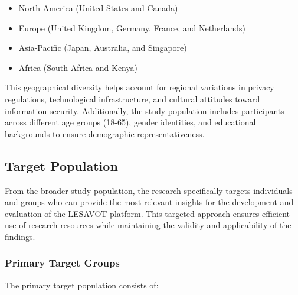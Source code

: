 \documentclass[12pt, a4paper, oneside]{book}
\begin{document}
\begin{itemize}[leftmargin=*]
    \item North America (United States and Canada)
    \item Europe (United Kingdom, Germany, France, and Netherlands)
    \item Asia-Pacific (Japan, Australia, and Singapore)
    \item Africa (South Africa and Kenya)
\end{itemize}

This geographical diversity helps account for regional variations in privacy regulations, technological infrastructure, and cultural attitudes toward information security. Additionally, the study population includes participants across different age groups (18-65), gender identities, and educational backgrounds to ensure demographic representativeness.

\subsection{Target Population}
From the broader study population, the research specifically targets individuals and groups who can provide the most relevant insights for the development and evaluation of the LESAVOT platform. This targeted approach ensures efficient use of research resources while maintaining the validity and applicability of the findings.

\subsubsection{Primary Target Groups}
The primary target population consists of:
\end{document}
